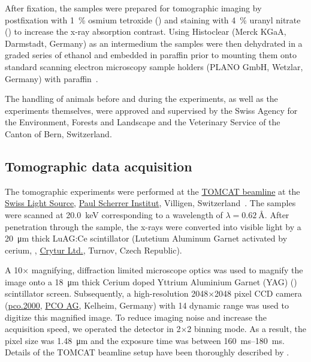 \documentclass[%
	paper=a4,%
	abstract=true,%
	]{scrartcl}
\begin{document}
After fixation, the samples were prepared for tomographic imaging by postfixation with \SI{1}{\percent} osmium tetroxide () and staining with \SI{4}{\percent} uranyl nitrate () to increase the x-ray absorption contrast. Using Histoclear (Merck KGaA, Darmstadt, Germany) as an intermedium the samples were then dehydrated in a graded series of ethanol and embedded in paraffin prior to mounting them onto standard scanning electron microscopy sample holders (PLANO GmbH, Wetzlar, Germany) with paraffin~\cite{Tsuda2008}.

The handling of animals before and during the experiments, as well as the experiments themselves, were approved and supervised by the Swiss Agency for the Environment, Forests and Landscape and the Veterinary Service of the Canton of Bern, Switzerland.

\subsection{Tomographic data acquisition\label{sec:tomcat}}
The tomographic experiments were performed at the \href{http://www.psi.ch/sls/tomcat/}{TOMCAT beamline} at the \href{http://www.psi.ch/sls/}{Swiss Light Source}, \href{http://www.psi.ch/}{Paul Scherrer Institut}, Villigen, Switzerland~\cite{Stampanoni2006a}. The samples were scanned at \SI{20.0}{\kilo\electronvolt} corresponding to a wavelength of \(\lambda=\SI{0.62}{\angstrom}\). %
After penetration through the sample, the x-rays were converted into visible light by a \SI{20}{\micro\meter} thick LuAG:Ce scintillator (Lutetium Aluminum Garnet activated by cerium, , \href{http://www.crytur.cz/}{Crytur Ltd.}, Turnov, Czech Republic).

A 10\(\times\) magnifying, diffraction limited microscope optics was used to magnify the image onto a \SI{18}{\micro\meter} thick Cerium doped Yttrium Aluminium Garnet (YAG) () scintillator screen. Subsequently, a high-resolution 2048\(\times\)2048 pixel CCD camera (\href{http://www.pco.de/sensitive-cameras/pco2000/}{pco.2000}, \href{http://www.pco.de/}{PCO AG}, Kelheim, Germany) with \SI{14}{\bit} dynamic range was used to digitize this magnified image. To reduce imaging noise and increase the acquisition speed, we operated the detector in 2\(\times\)2 binning mode. As a result, the pixel size was \SI{1.48}{\micro\meter} and the exposure time was between \SIrange{160}{180}{\milli\second}. Details of the TOMCAT beamline setup have been thoroughly described by \citet{Stampanoni2006a}.
\end{document}
